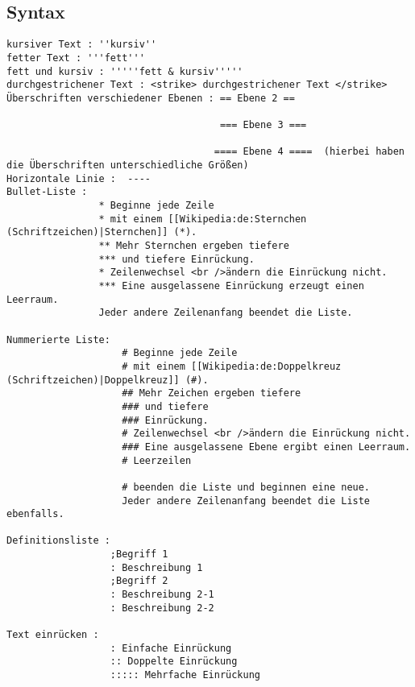 \subsection{Syntax}
 \begin{verbatim}
kursiver Text : ''kursiv''
fetter Text : '''fett'''
fett und kursiv : '''''fett & kursiv'''''
durchgestrichener Text : <strike> durchgestrichener Text </strike>
Überschriften verschiedener Ebenen : == Ebene 2 ==

                                     === Ebene 3 ===

                                    ==== Ebene 4 ====  (hierbei haben die Überschriften unterschiedliche Größen)
Horizontale Linie :  ----
Bullet-Liste : 
                * Beginne jede Zeile
                * mit einem [[Wikipedia:de:Sternchen (Schriftzeichen)|Sternchen]] (*).
                ** Mehr Sternchen ergeben tiefere
                *** und tiefere Einrückung.
                * Zeilenwechsel <br />ändern die Einrückung nicht.
                *** Eine ausgelassene Einrückung erzeugt einen Leerraum.
                Jeder andere Zeilenanfang beendet die Liste.

Nummerierte Liste: 
                    # Beginne jede Zeile
                    # mit einem [[Wikipedia:de:Doppelkreuz (Schriftzeichen)|Doppelkreuz]] (#).
                    ## Mehr Zeichen ergeben tiefere
                    ### und tiefere
                    ### Einrückung.
                    # Zeilenwechsel <br />ändern die Einrückung nicht.
                    ### Eine ausgelassene Ebene ergibt einen Leerraum.
                    # Leerzeilen

                    # beenden die Liste und beginnen eine neue.
                    Jeder andere Zeilenanfang beendet die Liste ebenfalls.

Definitionsliste : 
                  ;Begriff 1
                  : Beschreibung 1
                  ;Begriff 2
                  : Beschreibung 2-1
                  : Beschreibung 2-2
                  
Text einrücken : 
                  : Einfache Einrückung
                  :: Doppelte Einrückung
                  ::::: Mehrfache Einrückung
 \end{verbatim}